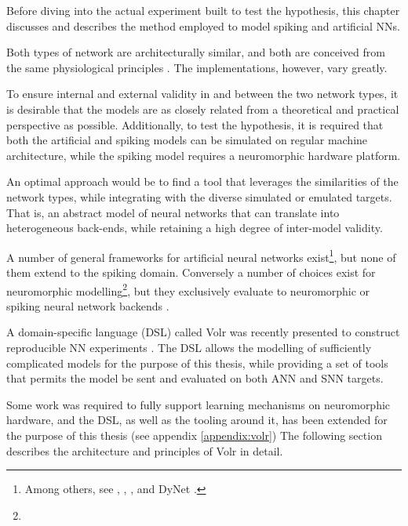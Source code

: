 
Before diving into the actual experiment built to test the hypothesis, this
chapter discusses and describes the method employed to model spiking
and artificial \gls{NN}s.

Both types of network are architecturally similar, and both are conceived from
the same physiological principles \autocite{dayan2001, russel2007, Nilsson2009, schmidhuber2014}.
The implementations, however, vary greatly.

To ensure internal and external validity in and between the two network types,
it is desirable that the models are as closely related from a theoretical and
practical perspective as possible.
Additionally, to test the hypothesis, it is required that both the artificial
and spiking models can be simulated on regular machine architecture, while
the spiking model requires a neuromorphic hardware platform.

An optimal approach would be to find a tool that leverages the similarities
of the network types, while integrating with the diverse simulated or emulated
targets.
That is, an abstract model of neural networks that can translate into
heterogeneous back-ends, while retaining a high degree of inter-model validity.

A number of general frameworks for artificial neural networks
exist\footnote{
  Among others, see \autocite{ONNX2018}, \autocite{PyTorch2018}, \autocite{TensorFlow2018},
  \autocite{Keras2018} and DyNet \autocite{Neubig2017}.
}, but none of them extend to the spiking domain.
Conversely a number of choices exist for neuromorphic modelling\footnote{
}, but they exclusively evaluate to neuromorphic or spiking neural network
backends \autocite{Jordan2018}.

A domain-specific language (DSL) called Volr was recently presented to
construct reproducible \gls{NN} experiments
\autocite{Pedersen2018:volr}.
The DSL allows the modelling of sufficiently complicated models for
the purpose of this thesis, while providing a set of tools that permits the
model be sent and evaluated on both \gls{ANN} and \gls{SNN} targets.

Some work was required to fully support learning mechanisms on
neuromorphic hardware, and the DSL, as well as the tooling around it, has been
extended for the purpose of this thesis (see appendix \ref{appendix:volr})
The following section describes the architecture and principles of Volr in
detail.

